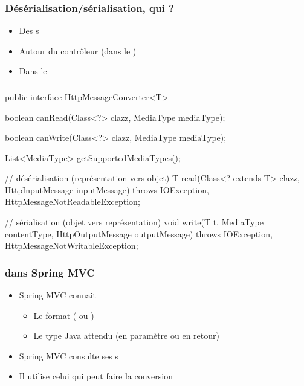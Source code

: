 \begin{frame}[fragile]
 \frametitle{Désérialisation/sérialisation, qui ?}

 \begin{itemize}
  \item Des s
  \item Autour du contrôleur (dans le )
  \item Dans le 
 \end{itemize}

\end{frame}

\begin{frame}[fragile]
 \frametitle{}

 \begin{javacode}
public interface HttpMessageConverter<T> {

  boolean canRead(Class<?> clazz, MediaType mediaType);

  boolean canWrite(Class<?> clazz, MediaType mediaType);

  List<MediaType> getSupportedMediaTypes();

  // d\'es\'erialisation (repr\'esentation vers objet)
  T read(Class<? extends T> clazz, HttpInputMessage inputMessage)
      throws IOException, HttpMessageNotReadableException;

  // s\'erialisation (objet vers repr\'esentation)
  void write(T t, MediaType contentType,
             HttpOutputMessage outputMessage)
      throws IOException, HttpMessageNotWritableException;

}
 \end{javacode}

\end{frame}

\begin{frame}[fragile]
 \frametitle{ dans Spring MVC}

 \begin{itemize}
  \item Spring MVC connait
  \begin{itemize}
   \item Le format ( ou )
   \item Le type Java attendu (en paramètre ou en retour)
  \end{itemize}
  \item Spring MVC consulte ses s
  \item Il utilise celui qui peut faire la conversion
 \end{itemize}

\end{frame}

